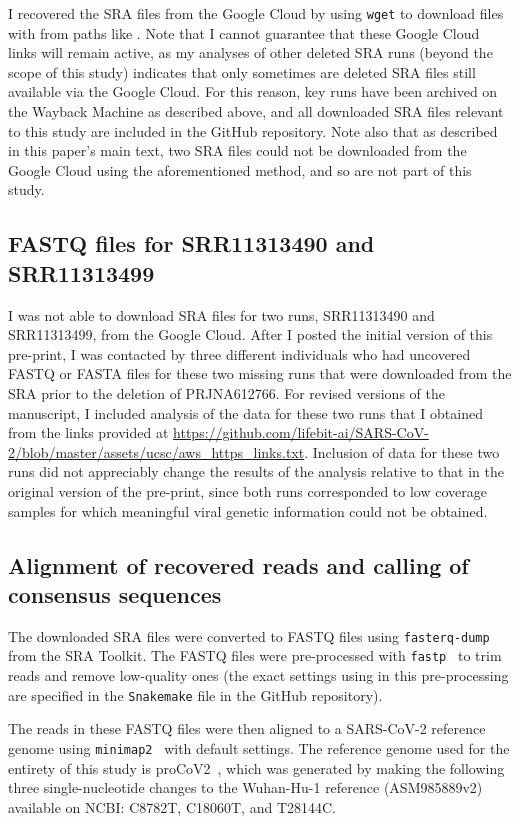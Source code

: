 \documentclass[9pt,twocolumn,twoside]{gsajnl_modified}
\begin{document}
{I recovered the SRA files from the Google Cloud by using \texttt{wget} to download files with from paths like .
Note that I cannot guarantee that these Google Cloud links will remain active, as my analyses of other deleted SRA runs (beyond the scope of this study) indicates that only sometimes are deleted SRA files still available via the Google Cloud.
For this reason, key runs have been archived on the Wayback Machine as described above, and all downloaded SRA files relevant to this study are included in the GitHub repository.
Note also that as described in this paper's main text, two SRA files could not be downloaded from the Google Cloud using the aforementioned method, and so are not part of this study.

\subsection{FASTQ files for SRR11313490 and SRR11313499}
I was not able to download SRA files for two runs, SRR11313490 and SRR11313499, from the Google Cloud.
After I posted the initial version of this pre-print, I was contacted by three different individuals who had uncovered FASTQ or FASTA files for these two missing runs that were downloaded from the SRA prior to the deletion of PRJNA612766.
For revised versions of the manuscript, I included analysis of the data for these two runs that I obtained from the links provided at \url{https://github.com/lifebit-ai/SARS-CoV-2/blob/master/assets/ucsc/aws_https_links.txt}.
Inclusion of data for these two runs did not appreciably change the results of the analysis relative to that in the original version of the pre-print, since both runs corresponded to low coverage samples for which meaningful viral genetic information could not be obtained.

\subsection{Alignment of recovered reads and calling of consensus sequences}
The downloaded SRA files were converted to FASTQ files using \texttt{fasterq-dump} from the SRA Toolkit.
The FASTQ files were pre-processed with \texttt{fastp}~\citep{chen2018fastp} to trim reads and remove low-quality ones (the exact settings using in this pre-processing are specified in the \texttt{Snakemake} file in the GitHub repository).

The reads in these FASTQ files were then aligned to a SARS-CoV-2 reference genome using \texttt{minimap2}~\citep{li2018minimap2} with default settings.
The reference genome used for the entirety of this study is proCoV2~\citep{kumar2021evolutionary}, which was generated by making the following three single-nucleotide changes to the Wuhan-Hu-1 reference (ASM985889v2) available on NCBI: C8782T, C18060T, and T28144C.

}
\end{document}
